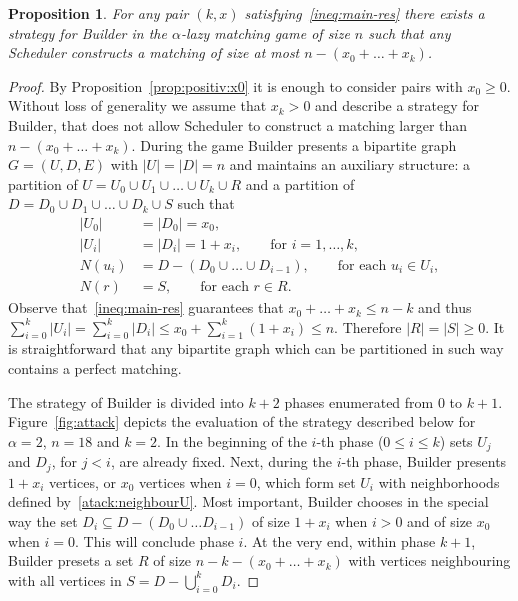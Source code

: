 \documentclass[12pt]{amsart}
\renewcommand{\leq}{\leqslant}
\renewcommand{\geq}{\geqslant}
\newtheorem{prop}[theorem]{Proposition}
\theoremstyle{definition}
\newcommand{\abs}[1]{\left\vert#1\right\vert}
\newcommand{\Br}{Builder\xspace}
\newcommand{\Sr}{Scheduler\xspace}
\begin{document}
\begin{prop}\label{prop:spoiler_bound}
For any pair $(k,x)$ 
satisfying~\eqref{ineq:main-res} there exists a strategy for \Br in the $\alpha$-lazy matching game of size $n$ such that any \Sr constructs a matching of size at most $n-(x_0+\ldots+x_k)$.
\end{prop}
\begin{proof}  
By Proposition~\ref{prop:positiv:x0} it is enough  to consider pairs with $x_0\geq0$.
Without loss of generality we assume that $x_k>0$ and describe a strategy for \Br, that does not allow \Sr to construct a matching larger than $n-(x_0+\ldots+x_k)$.
During the game \Br presents a bipartite graph $G=(U, D,E)$ with $\abs{U}=\abs{D}=n$ and maintains an auxiliary structure:
a partition of $U=  U_0\cup U_1\cup\ldots\cup U_k\cup R$ and a partition of $D =  D_0\cup D_1\cup\ldots\cup D_k\cup S$ such that
\begin{align}
    \abs{U_0} &= \abs{D_0} = x_0,\nonumber\\
    \abs{U_i} &=  \abs{D_i}=1+x_i,\qquad\textrm{for }i=1,\ldots,k,\nonumber\\
    N(u_i)    &=  D-(D_0\cup\ldots\cup D_{i-1}),\qquad\textrm{for each }u_i\in U_i,\label{atack:neighbourU}\\
    N(r)      &=  S,\qquad\textrm{for each }r\in R.\label{atack:neighbourR}
\end{align}
Observe that~\eqref{ineq:main-res} guarantees that $x_0+\ldots+x_k\leq n-k$ and thus 
$\sum_{i=0}^k\abs{U_i} = \sum_{i=0}^k\abs{D_i}\leq x_0 + \sum_{i=1}^k(1+x_i) \leq n$.
Therefore $\abs{R}=\abs{S}\geq0$.
It is straightforward that any bipartite graph which can be partitioned in such way contains a perfect matching.
  
 
The strategy of \Br is divided into $k+2$ phases enumerated from $0$ to $k+1$.
{Figure~\ref{fig:attack} depicts the evaluation of the strategy described below for $\alpha=2$, $n=18$ and $k=2$.}
In the beginning of the $i$-th phase ($0\leq i\leq k$) sets $U_j$ and $D_j$, for $j<i$, are already fixed. Next, during the $i$-th phase, \Br presents $1+x_i$ vertices, or $x_0$ vertices when $i=0$, which form  set $U_i$ with neighborhoods defined by~\eqref{atack:neighbourU}. 
Most important, \Br chooses in the special way the set $D_i\subseteq D-(D_0\cup\ldots D_{i-1})$ of size $1+x_i$ when $i>0$ and of size $x_0$ when $i=0$.
This will conclude phase $i$.
At the very end, within phase $k+1$, \Br presets a set $R$ of size $n-k-(x_0+\ldots+x_k)$ with vertices neighbouring with all vertices in $S=D-\bigcup_{i=0}^kD_i$.
  

\end{proof}
\end{document}
